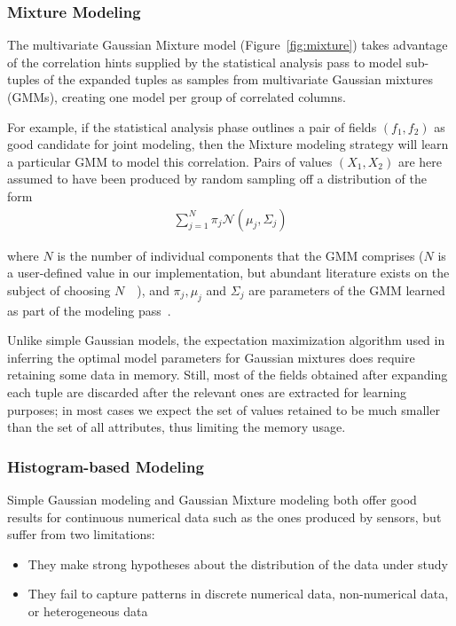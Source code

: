 \subsubsection{Mixture Modeling}
\label{sec:mixture_model}
The multivariate Gaussian Mixture model (Figure~\ref{fig:mixture}) takes advantage of the correlation hints supplied by the statistical analysis pass to model sub-tuples of the expanded tuples as samples from multivariate Gaussian mixtures (GMMs), creating one model per group of correlated columns.

For example, if the statistical analysis phase outlines a pair of fields $(f_1, f_2)$ as good candidate for joint modeling, then the Mixture modeling strategy will learn a particular GMM to model this correlation. Pairs of values $(X_1, X_2)$ are here assumed to have been produced by random sampling off a distribution of the form
\begin{align*}
\sum_{j=1}^{N} \pi_j \mathcal N(\mu_j, \Sigma_j)
\end{align*}

where $N$ is the number of individual components that the GMM comprises ($N$ is a user-defined value in our implementation, but abundant literature exists on the subject of choosing $N$~\cite{Schwartz1978}~\cite{Akaike1974}), and $\pi_j, \mu_j$ and $\Sigma_j$ are parameters of the GMM learned as part of the modeling pass~\cite{Dempster1977}.

Unlike simple Gaussian models, the expectation maximization algorithm used in inferring the optimal model parameters for Gaussian mixtures does require retaining some data in memory. Still, most of the fields obtained after expanding each tuple are discarded after the relevant ones are extracted for learning purposes; in most cases we expect the set of values retained to be much smaller than the set of all attributes, thus limiting the memory usage.

\subsubsection{Histogram-based Modeling}
\label{sec:histograms}
Simple Gaussian modeling and Gaussian Mixture modeling both offer good results for continuous numerical data such as the ones produced by sensors, but suffer from two limitations:

\begin{itemize}
\item They make strong hypotheses about the distribution of the data under study
\item They fail to capture patterns in discrete numerical data, non-numerical data, or heterogeneous data
\end{itemize}


